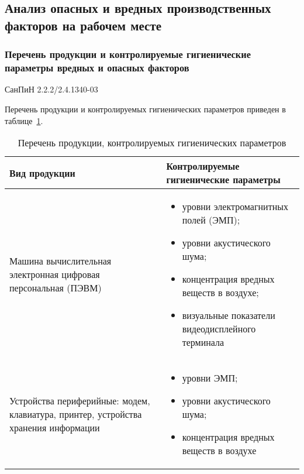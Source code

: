 \subsection{Анализ опасных и вредных производственных факторов на рабочем месте}





\subsubsection{Перечень продукции и контролируемые гигиенические параметры вредных и опасных факторов}


СанПиН 2.2.2/2.4.1340-03

Перечень продукции и контролируемых гигиенических параметров приведен в таблице~\ref{tab:life_1}.

\begin{table}[h!]
\caption{ Перечень продукции, контролируемых гигиенических параметров }
\label{tab:life_1}
\begin{center}
\begin{tabularx}{\linewidth}{|X|X|}
\hline
Вид продукции & Контролируемые гигиенические параметры\\
\hline
\item Машина вычислительная электронная цифровая персональная (ПЭВМ) & 
\begin{itemize}
 \item уровни электромагнитных полей (ЭМП);
 \item уровни акустического шума;
 \item концентрация вредных веществ в воздухе;
 \item визуальные показатели видеодисплейного терминала
\end{itemize}									     
\\
\hline
\item Устройства периферийные: модем, клавиатура, принтер, устройства хранения информации & 
\begin{itemize}
 \item уровни ЭМП;
 \item уровни акустического шума;
 \item концентрация вредных веществ в воздухе
\end{itemize}
 \\
\hline
\end{tabularx}
\end{center}
\end{table}




